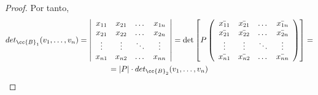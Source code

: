 \begin{proof}
    Por tanto,
    \begin{multline*}
        det_{\cc{B}_1} (v_1,\dots,v_n) = \left|\begin{array}{cccc}
            x_{11} & x_{21} & \dots & x_{1n} \\
            x_{21} & x_{22} & \dots & x_{2n} \\
            \vdots & \vdots & \ddots & \vdots \\
            x_{n1} & x_{n2} & \dots & x_{nn} \\
        \end{array}\right|
        = \det\left[ P \left(\begin{array}{cccc}
            \bar{x_{11}} & \bar{x_{21}} & \dots & \bar{x_{1n}} \\
            \bar{x_{21}} & \bar{x_{22}} & \dots & \bar{x_{2n}} \\
            \vdots & \vdots & \ddots & \vdots \\
            \bar{x_{n1}} & \bar{x_{n2}} & \dots & \bar{x_{nn}} \\
        \end{array}\right)\right] =\\= |P|\cdot  det_{\cc{B}_2} (v_1,\dots,v_n)
    \end{multline*}
\end{proof}

